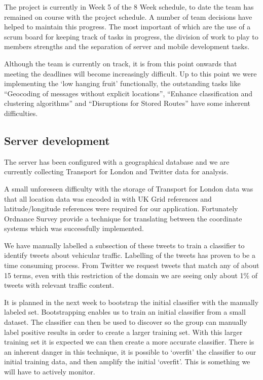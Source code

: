 ﻿The project is currently in Week 5 of the 8 Week schedule, to date the team has
remained on course with the project schedule. A number of team decisions have
helped to maintain this progress. The most important of which are the use of a
scrum board for keeping track of tasks in progress, the division of work to
play to members strengths and the separation of server and mobile development
tasks.

Although the team is currently on track, it is from this point onwards that
meeting the deadlines will become increasingly difficult. Up to this point we
were implementing the ‘low hanging fruit’ functionally, the outstanding tasks
like “Geocoding of messages without explicit locations”, “Enhance
classification and clustering algorithms” and “Disruptions for Stored Routes”
have some inherent difficulties.

\subsection{Server development}

The server has been configured with a geographical database and we are
currently collecting Transport for London and Twitter data for analysis.

A small unforeseen difficulty with the storage of Transport for London data was
that all location data was encoded in with UK Grid references and
latitude/longitude references were required for our application. Fortunately
Ordnance Survey provide a technique for translating between the coordinate
systems which was successfully implemented.

We have manually labelled a subsection of these tweets to train a
classifier to identify tweets about vehicular traffic. Labelling of the tweets
has proven to be a time consuming process. From Twitter we request tweets that
match any of about 15 terms, even with this restriction of the domain
we are seeing only about 1\% of tweets with relevant traffic content.

It is planned in the next week to bootstrap the initial classifier with the manually
labeled set. Bootstrapping enables us to train an initial classifier from a
small dataset. The classifier can then be used to discover so the group can manually label
positive results in order to create a larger training set. With this larger
training set it is expected we can then create a more accurate classifier.
There is an inherent danger in this technique, it is possible to `overfit' the
classifier to our initial training data, and then amplify the initial `overfit'. This
is something we will have to actively monitor.

